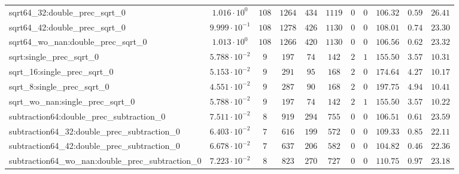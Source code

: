 \begin{tabular}{|l|c|c|c|c|c|c|c|c|c|c|}
sqrt64\_32:double\_prec\_sqrt\_0                          & $ 1.016 \cdot 10^{0}  $ & $ 108    $ & $ 1264   $ & $ 434   $ & $ 1119  $ & $ 0   $ & $ 0    $ & $ 106.32      $ & $ 0.59    $ & $ 26.41   $ \\
sqrt64\_42:double\_prec\_sqrt\_0                          & $ 9.999 \cdot 10^{-1} $ & $ 108    $ & $ 1278   $ & $ 426   $ & $ 1130  $ & $ 0   $ & $ 0    $ & $ 108.01      $ & $ 0.74    $ & $ 23.30   $ \\
sqrt64\_wo\_nan:double\_prec\_sqrt\_0                     & $ 1.013 \cdot 10^{0}  $ & $ 108    $ & $ 1266   $ & $ 420   $ & $ 1130  $ & $ 0   $ & $ 0    $ & $ 106.56      $ & $ 0.62    $ & $ 23.32   $ \\
sqrt:single\_prec\_sqrt\_0                                & $ 5.788 \cdot 10^{-2} $ & $ 9      $ & $ 197    $ & $ 74    $ & $ 142   $ & $ 2   $ & $ 1    $ & $ 155.50      $ & $ 3.57    $ & $ 10.31   $ \\
sqrt\_16:single\_prec\_sqrt\_0                            & $ 5.153 \cdot 10^{-2} $ & $ 9      $ & $ 291    $ & $ 95    $ & $ 168   $ & $ 2   $ & $ 0    $ & $ 174.64      $ & $ 4.27    $ & $ 10.17   $ \\
sqrt\_8:single\_prec\_sqrt\_0                             & $ 4.551 \cdot 10^{-2} $ & $ 9      $ & $ 287    $ & $ 90    $ & $ 168   $ & $ 2   $ & $ 0    $ & $ 197.75      $ & $ 4.94    $ & $ 10.41   $ \\
sqrt\_wo\_nan:single\_prec\_sqrt\_0                       & $ 5.788 \cdot 10^{-2} $ & $ 9      $ & $ 197    $ & $ 74    $ & $ 142   $ & $ 2   $ & $ 1    $ & $ 155.50      $ & $ 3.57    $ & $ 10.22   $ \\
subtraction64:double\_prec\_subtraction\_0                & $ 7.511 \cdot 10^{-2} $ & $ 8      $ & $ 919    $ & $ 294   $ & $ 755   $ & $ 0   $ & $ 0    $ & $ 106.51      $ & $ 0.61    $ & $ 23.59   $ \\
subtraction64\_32:double\_prec\_subtraction\_0            & $ 6.403 \cdot 10^{-2} $ & $ 7      $ & $ 616    $ & $ 199   $ & $ 572   $ & $ 0   $ & $ 0    $ & $ 109.33      $ & $ 0.85    $ & $ 22.11   $ \\
subtraction64\_42:double\_prec\_subtraction\_0            & $ 6.678 \cdot 10^{-2} $ & $ 7      $ & $ 637    $ & $ 206   $ & $ 582   $ & $ 0   $ & $ 0    $ & $ 104.82      $ & $ 0.46    $ & $ 22.36   $ \\
subtraction64\_wo\_nan:double\_prec\_subtraction\_0       & $ 7.223 \cdot 10^{-2} $ & $ 8      $ & $ 823    $ & $ 270   $ & $ 727   $ & $ 0   $ & $ 0    $ & $ 110.75      $ & $ 0.97    $ & $ 23.18   $ \\

\end{tabular}
